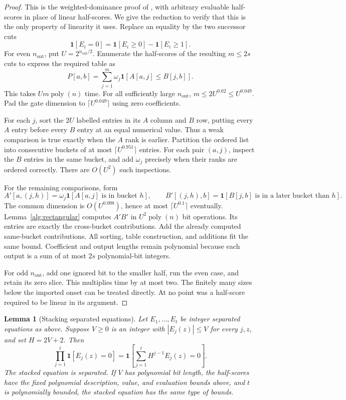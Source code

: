 \documentclass[11pt,letterpaper]{article}
\newtheorem{lemma}[theorem]{Lemma}
\theoremstyle{definition}
\theoremstyle{remark}
\newcommand{\poly}{\operatorname{poly}}
\newcommand{\ind}{\mathbf 1}
\begin{document}
\begin{proof}
This is the weighted-dominance proof of
\cite[Theorem~B.3]{NagCubic}, with arbitrary evaluable half-scores in
place of linear half-scores.  We give the reduction to verify that this is
the only property of linearity it uses.  Replace an equality by the two
successor cuts
\[
 \ind[E_i=0]=\ind[E_i\ge0]-\ind[E_i\ge1].
\]
For even $n_{\mathrm{out}}$, put $U=2^{n_{\mathrm{out}}/2}$.  Enumerate the half-scores of the resulting
$m\le2s$ cuts to express the required table as
\[
 P[a,b]=\sum_{j=1}^m\omega_j\ind[A[a,j]\le B[j,b]].
\]
This takes $Um\poly(n)$ time.  For all sufficiently large $n_{\mathrm{out}}$,
$m\le2U^{0.02}\le U^{0.049}$.  Pad the gate dimension to
$\lceil U^{0.049}\rceil$ using zero coefficients.

For each $j$, sort the $2U$ labelled entries in its $A$ column and $B$
row, putting every $A$ entry before every $B$ entry at an equal numerical
value.  Thus a weak comparison is true exactly when the $A$ rank is
earlier.  Partition the ordered list into consecutive buckets of at most
$\lceil U^{0.951}\rceil$ entries.  For each pair $(a,j)$, inspect the
$B$ entries in the same bucket, and add $\omega_j$ precisely when their
ranks are ordered correctly.  There are $O(U^2)$ such inspections.

For the remaining comparisons, form
\[
 A'[a,(j,h)]=\omega_j\ind[A[a,j]\text{ is in bucket }h],
 \qquad
 B'[(j,h),b]=\ind[B[j,b]\text{ is in a later bucket than }h].
\]
The common dimension is $O(U^{0.098})$, hence at most
$\lceil U^{0.1}\rceil$ eventually.  Lemma~\ref{alg:rectangular}
computes $A'B'$ in $U^2\poly(n)$ bit operations.  Its entries are exactly
the cross-bucket contributions.  Add the already computed same-bucket
contributions.  All sorting, table construction, and additions fit the
same bound.  Coefficient and output lengths remain polynomial because
each output is a sum of at most $2s$ polynomial-bit integers.

For odd $n_{\mathrm{out}}$, add one ignored bit to the smaller half, run the even case,
and retain its zero slice.  This multiplies time by at most two.
The finitely many sizes below the imported onset can be treated directly.
At no point was a half-score required to be linear in its argument.
\end{proof}

\begin{lemma}[Stacking separated equations]
\label{alg:stack}
Let $E_1,\ldots,E_t$ be integer separated equations as above.  Suppose
$V\ge0$ is an integer with $|E_j(z)|\le V$ for every $j,z$, and set
$H=2V+2$.
Then
\[
 \prod_{j=1}^t\ind[E_j(z)=0]
 =\ind\!\left[\sum_{j=1}^t H^{j-1}E_j(z)=0\right].
\]
The stacked equation is separated.  If $V$ has polynomial bit length,
the half-scores have the fixed polynomial description, value, and
evaluation bounds above, and $t$ is polynomially bounded, the stacked
equation has the same type of bounds.
\end{lemma}
\end{document}
